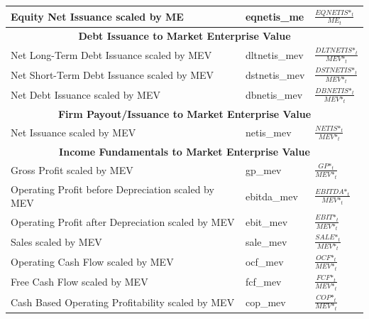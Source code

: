 \documentclass[12pt,title,fleqn]{article}
\begin{document}
{\begin{longtable}{@{\extracolsep{\fill}}|p{6cm}|l|p{8cm}|@{}}
    Equity Net Issuance scaled by ME & eqnetis\_me &$\frac{EQNETIS\mbox{*}_t}{ME_t}$ \\

    \hline 
	\multicolumn{3}{|c|}{\textbf{Debt Issuance to Market Enterprise Value}} \\
	\hline 
	
    Net Long-Term Debt Issuance scaled by MEV & dltnetis\_mev &$\frac{DLTNETIS\mbox{*}_t}{MEV\mbox{*}_t}$\\	
	
    Net Short-Term Debt Issuance scaled by MEV & dstnetis\_mev &$\frac{DSTNETIS\mbox{*}_t}{MEV\mbox{*}_t}$ \\
	
    Net Debt Issuance scaled by MEV & dbnetis\_mev &$\frac{DBNETIS\mbox{*}_t}{MEV\mbox{*}_t}$\\
	
    \hline 
	\multicolumn{3}{|c|}{\textbf{Firm Payout/Issuance to Market Enterprise Value}} \\
	\hline 	
	
    Net Issuance scaled by MEV & netis\_mev &$\frac{NETIS\mbox{*}_t}{MEV\mbox{*}_t}$ \\
	
    \hline 
	\multicolumn{3}{|c|}{\textbf{Income Fundamentals to Market Enterprise Value}} \\
	\hline 		
	
	Gross Profit scaled by MEV & gp\_mev &$\frac{GP\mbox{*}_t}{MEV\mbox{*}_t}$ \\
	
	Operating Profit before Depreciation scaled by MEV & ebitda\_mev &$\frac{EBITDA\mbox{*}_t}{MEV\mbox{*}_t}$\\
	
	Operating Profit after Depreciation scaled by MEV & ebit\_mev &$\frac{EBIT\mbox{*}_t}{MEV\mbox{*}_t}$\\
	
	Sales scaled by MEV & sale\_mev &$\frac{SALE\mbox{*}_t}{MEV\mbox{*}_t}$\\
	
	Operating Cash Flow scaled by MEV & ocf\_mev & $\frac{OCF\mbox{*}_t}{MEV\mbox{*}_t}$ \\
    
    Free Cash Flow scaled by MEV & fcf\_mev &$\frac{FCF\mbox{*}_t}{MEV\mbox{*}_t}$\\
    
    Cash Based Operating Profitability scaled by MEV & cop\_mev &$\frac{COP\mbox{*}_t}{MEV\mbox{*}_t}$ \\
	

\end{longtable}}
\end{document}
